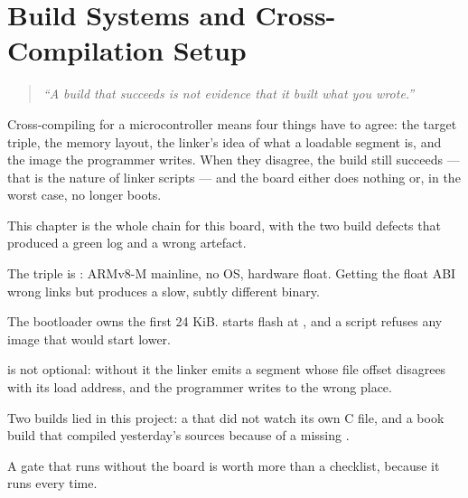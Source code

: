 
\chapter{Build Systems and Cross-Compilation Setup}
\label{ch:chapter-03}

\begin{quote}
    \textit{``A build that succeeds is not evidence that it built what you wrote.''}
\end{quote}

Cross-compiling for a microcontroller means four things have to agree: the target triple, the memory
layout, the linker's idea of what a loadable segment is, and the image the programmer writes. When
they disagree, the build still succeeds — that is the nature of linker scripts — and the board either
does nothing or, in the worst case, no longer boots.

This chapter is the whole chain for this board, with the two build defects that produced a green log
and a wrong artefact.

\minitoc

\clearpage








\clearpage

\begin{keytakeaways}
    \item The triple is : ARMv8-M mainline, no OS, hardware
          float. Getting the float ABI wrong links but produces a slow, subtly different binary.
    \item The bootloader owns the first 24 KiB.  starts flash at
          , and a script refuses any image that would start lower.
    \item {} is not optional: without it the linker emits a segment whose file
          offset disagrees with its load address, and the programmer writes to the wrong place.
    \item Two builds lied in this project: a  that did not watch its own C file,
          and a book build that compiled yesterday's sources because of a missing
          .
    \item A gate that runs without the board is worth more than a checklist, because it runs every
          time.
\end{keytakeaways}
